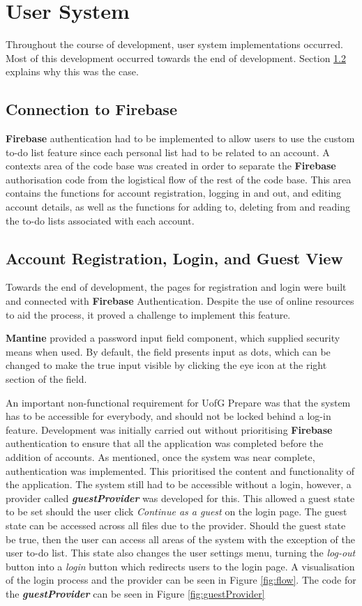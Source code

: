 \documentclass{l4proj}
\begin{document}
\section{User System}
Throughout the course of development, user system implementations occurred. Most of this development occurred towards the end of development. Section \ref{GuestView} explains why this was the case.

\subsection{Connection to Firebase}
\textbf{Firebase} authentication had to be implemented to allow users to use the custom to-do list feature since each personal list had to be related to an account. A contexts area of the code base was created in order to separate the \textbf{Firebase} authorisation code from the logistical flow of the rest of the code base. This area contains the functions for account registration,  logging in and out,  and editing account details,  as well as the functions for adding to,  deleting from and reading the to-do lists associated with each account.

\subsection{Account Registration,  Login,  and Guest View} \label{GuestView}
Towards the end of development,  the pages for registration and login were built and connected with \textbf{Firebase} Authentication. Despite the use of online resources to aid the process,  it proved a challenge to implement this feature.

\textbf{Mantine} provided a password input field component,  which supplied security means when used. By default,  the field presents input as dots,  which can be changed to make the true input visible by clicking the eye icon at the right section of the field.

An important non-functional requirement for UofG Prepare was that the system has to be accessible for everybody,  and should not be locked behind a log-in feature. Development was initially carried out without prioritising \textbf{Firebase} authentication to ensure that all the application was completed before the addition of accounts. As mentioned,  once the system was near complete, authentication was implemented. This prioritised the content and functionality of the application. The system still had to be accessible without a login, however, a provider called \textit{\textbf{guestProvider}} was developed for this. This allowed a guest state to be set should the user click \textit{Continue as a guest} on the login page. The guest state can be accessed across all files due to the provider. Should the guest state be true,  then the user can access all areas of the system with the exception of the user to-do list. This state also changes the user settings menu,  turning the \textit{log-out} button into a \textit{login} button which redirects users to the login page. A visualisation of the login process and the provider can be seen in Figure \ref{fig:flow}. The code for the \textbf{\textit{guestProvider}} can be seen in Figure \ref{fig:guestProvider}
\end{document}
